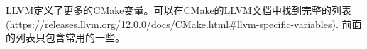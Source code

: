 LLVM定义了更多的CMake变量。可以在CMake的LLVM文档中找到完整的列表 (\url{https://releases.llvm.org/12.0.0/docs/CMake.html\#llvm-specific-variables}). 前面的列表只包含常用的一些。\par













































